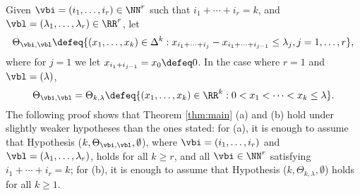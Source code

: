 \documentclass[12pt, reqno, twoside, letterpaper]{amsart}
\begin{document}
Given $\vbi = (i_1,\ldots,i_r) \in \NN^r$ such that 
$i_1 + \cdots + i_r = k$, and 
$\vbl = (\lambda_1,\ldots,\lambda_r) \in \RR^r$, let 
\begin{equation}
 \label{eq:defThet}
 \Theta_{\vbi,\vbl}
  \defeq 
   \{(x_1,\ldots,x_k) \in \Delta^k : x_{i_1 + \cdots + i_j} - x_{i_1 + \cdots + i_{j - 1}} \le \lambda_j, j = 1,\ldots,r\},
\end{equation}
where for $j = 1$ we let $x_{i_1 + i_{j - 1}} = x_0 \defeq 0$. 
%
In the case where $r = 1$ and $\vbl = (\lambda)$, 
\begin{equation}
 \label{eq:defThetkl}
 \Theta_{\vbi,\vbl}
  = 
   \Theta_{k,\lambda}
    \defeq 
     \{(x_1,\ldots,x_k) \in \RR^k : 0 < x_1 < \cdots < x_k \le \lambda\}. 
\end{equation}
%
The following proof shows that Theorem \ref{thm:main} (a) and (b) 
hold under slightly weaker hypotheses than the ones stated:
for (a), it is enough to assume that 
Hypothesis \textup{(}$k,\Theta_{\vbi,\vbl},\emptyset$\textup{)}, 
where $\vbi = (i_1,\ldots,i_r)$ and 
$\vbl = (\lambda_1,\ldots,\lambda_r)$, holds for all $k \ge r$, 
and all $\vbi \in \NN^r$ satisfying $i_1 + \cdots + i_r = k$;
for (b), it is enough to assume that 
Hypothesis \textup{(}$k,\Theta_{k,\lambda},\emptyset$\textup{)} 
holds for all $k \ge 1$.
\end{document}

